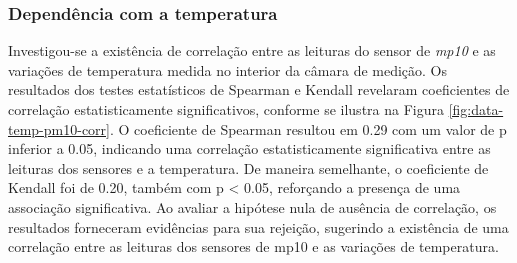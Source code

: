 \subsubsection{Dependência com a temperatura}

Investigou-se a existência de correlação entre as leituras do sensor de \textit{mp10} e as variações de temperatura medida no interior da câmara de medição. Os resultados dos testes estatísticos de Spearman e Kendall revelaram coeficientes de correlação estatisticamente significativos, conforme se ilustra na Figura \ref{fig:data-temp-pm10-corr}. O coeficiente de Spearman resultou em 0.29 com um valor de p inferior a 0.05, indicando uma correlação estatisticamente significativa entre as leituras dos sensores e a temperatura. De maneira semelhante, o coeficiente de Kendall foi de 0.20, também com p < 0.05, reforçando a presença de uma associação significativa. Ao avaliar a hipótese nula de ausência de correlação, os resultados forneceram evidências para sua rejeição, sugerindo a existência de uma correlação entre as leituras dos sensores de \acrshort{mp10} e as variações de temperatura.